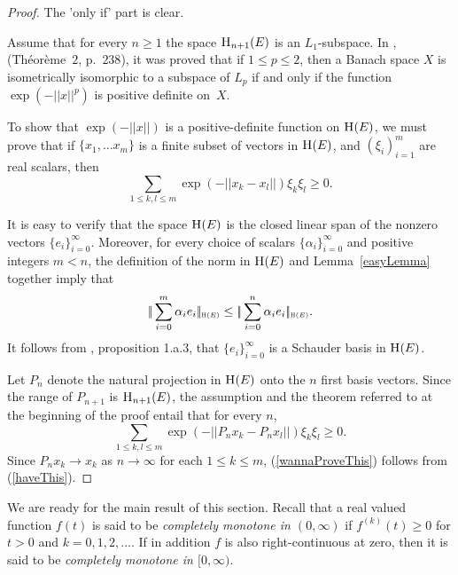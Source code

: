 \documentclass{article}[1100]
\theoremstyle{definition}
\theoremstyle{remark}
\newcommand\norma[1]{|\!|#1|\!|}
\newcommand\mySpaceH[1]{\textsc{H}(#1)}
\newcommand\mySpace[2]{\textsc{H}_{#1}(#2)}
\begin{document}
\begin{proof}
The 'only if' part is clear. 
 
\medskip

 Assume that for every $n\geq1$ the space  $\mySpace{n+1}{E}$ is an $L_1$-subspace. In \cite{BDCK}, (Th\'eor\`eme~$2$, p.~$238$), it was proved that if $1\leq p\leq 2$, then a Banach space $X$ is isometrically isomorphic to a subspace of $L_p$ if and only if the function $\exp(-\norma{x}^p)$ is positive definite on~$X$.



To show that $\exp(-\norma{x})$ is a positive-definite function on $\mySpaceH{E}$, we must prove that if $\{x_1,\dots x_m\}$ is a finite
 subset of vectors in $\mySpaceH{E}$, and $(\xi_i)_{i=1}^m$ are  real scalars, then 
 \begin{equation}\label{wannaProveThis}
\sum_{1\leq k,l\leq m}\exp(-\norma{x_k-x_l})\xi_k\xi_l\geq 0.
\end{equation}

It is easy to verify that the space $\mySpaceH{E}$ is  the closed linear span of the nonzero vectors $\{e_i\}_{i=0}^{\infty}$. Moreover,
 for every choice of scalars $\{\alpha_i\}_{i=0}^{\infty}$ and positive integers $m<n$, the definition of the norm in
 $\mySpaceH{E}$ and Lemma~\ref{easyLemma} together imply that
\[ \norma{\sum_{i=0}^m\alpha_ie_i}_{\scriptscriptstyle\mySpaceH{E}}\leq \norma{\sum_{i=0}^n\alpha_ie_i}_{\scriptscriptstyle\mySpaceH{E}}.\]
It follows from  \cite{LT}, proposition 1.a.3,  that $\{e_i\}_{i=0}^{\infty}$ is a Schauder basis in $\mySpaceH{E}$.

\medskip

Let $P_n$ denote the natural projection in $\mySpaceH{E}$ onto the $n$ first basis vectors.
Since the range of $P_{n+1}$ is $\mySpace{n+1}{E}$, the assumption and the theorem referred to at the beginning of the proof entail that for every $n$,
\begin{equation}\label{haveThis}
\sum_{1\leq k,l\leq m}\exp(-\norma{P_nx_k-P_nx_l})\xi_k\xi_l\geq 0.
\end{equation}
Since $P_nx_k\to x_k$ as $n\to\infty$ for each $1\leq k\leq m$, (\ref{wannaProveThis}) follows from (\ref{haveThis}).
\end{proof}
 
 \medskip
 

We are ready for the main result of this section.
Recall that a real valued function $f(t)$ is said to be \emph{completely monotone in $(0,\infty)$}  if
$f^{(k)}(t)\geq 0$ for $t>0$ and $k=0,1,2,\dots$. If in addition $f$ is also right-continuous at zero, then
it is said to be \emph{completely monotone in $[0,\infty)$}.
\end{document}
